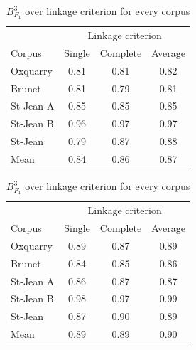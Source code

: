 \begin{table}
  \centering
  \caption{$B^3_{F_1}$ over linkage criterion for every corpus}
  \label{tab:clustering_linkages}

  \label{tab:clustering_linkages_stop_clusters}
  \begin{tabular}{l c c c}
    \toprule
           & \multicolumn{3}{c}{Linkage criterion} \\
    Corpus & Single & Complete & Average \\
    \midrule
    Oxquarry  & 0.81 & 0.81 & 0.82 \\
    Brunet    & 0.81 & 0.79 & 0.81 \\
    St-Jean A & 0.85 & 0.85 & 0.85 \\
    St-Jean B & 0.96 & 0.97 & 0.97 \\
    St-Jean   & 0.79 & 0.87 & 0.88 \\
    \midrule
    Mean      & 0.84 & 0.86 & 0.87 \\
    \bottomrule
  \end{tabular}

  \vspace{0.5cm}

  \label{tab:clustering_linkages_stop_distance_threshold}
  \begin{tabular}{l c c c}
    \toprule
           & \multicolumn{3}{c}{Linkage criterion} \\
    Corpus & Single & Complete & Average \\
    \midrule
    Oxquarry  & 0.89 & 0.87 & 0.89 \\
    Brunet    & 0.84 & 0.85 & 0.86 \\
    St-Jean A & 0.86 & 0.87 & 0.87 \\
    St-Jean B & 0.98 & 0.97 & 0.99 \\
    St-Jean   & 0.87 & 0.90 & 0.89 \\
    \midrule
    Mean      & 0.89 & 0.89 & 0.90 \\
    \bottomrule
  \end{tabular}

  \vspace{0.5cm}


\end{table}
